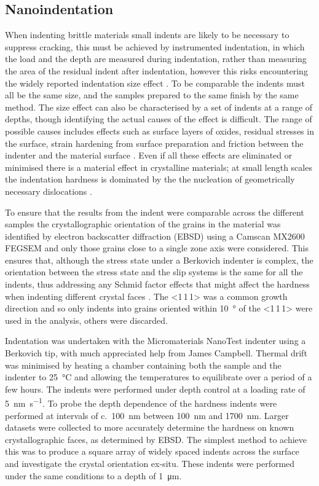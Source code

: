 \subsection{Nanoindentation}

When indenting brittle materials small indents are likely to be necessary to suppress cracking, this must be achieved by instrumented indentation, in which the load and the depth are measured during indentation, rather than measuring the area of the residual indent after indentation, however this risks encountering the widely reported indentation size effect \cite{Korte2009,Cripps2011}. To be comparable the indents must all be the same size, and the samples prepared to the same finish by the same method. The size effect can also be characterised by a set of indents at a range of depths, though identifying the actual causes of the effect is difficult. The range of possible causes includes effects such as surface layers of oxides, residual stresses in the surface, strain hardening from surface preparation and friction between the indenter and the material surface \cite{Cripps2011}. Even if all these effects are eliminated or minimised there is a material effect in crystalline materials; at small length scales the indentation hardness is dominated by the the nucleation of geometrically necessary dislocations \cite{Cripps2011}.






To ensure that the results from the indent were comparable across the different samples the crystallographic orientation of the grains in the material was identified by electron backscatter diffraction (EBSD) using a Camscan MX2600 FEGSEM and only those grains close to a single zone axis were considered. This ensures that, although the stress state under a Berkovich indenter is complex, the orientation between the stress state and the slip systems is the same for all the indents, thus addressing any Schmid factor effects that might affect the hardness when indenting different crystal faces \cite{Kelly2012ch7}. The <1\,1\,1> was a common growth direction and so only indents into grains oriented within \SI{10}{\degree} of the <1\,1\,1> were used in the analysis, others were discarded.


Indentation was undertaken with the Micromaterials NanoTest indenter using a Berkovich tip, with much appreciated help from James Campbell. Thermal drift was minimised by heating a chamber containing both the sample and the indenter to \SI{25}{\celsius} and allowing the temperatures to equilibrate over a period of a few hours. The indents were performed under depth control at a loading rate of \SI{5}{\nano\meter\per\second}. To probe the depth dependence of the hardness indents were performed at intervals of c.~\SI{100}{\nano\meter} between \SI{100}{\nano\meter} and \SI{1700}{\nano\meter}. Larger datasets were collected to more accurately determine the hardness on known crystallographic faces, as determined by EBSD. The simplest method to achieve this was to produce a square array of widely spaced indents across the surface and investigate the crystal orientation ex-situ. These indents were performed under the same conditions to a depth of \SI{1}{\micro\meter}.

